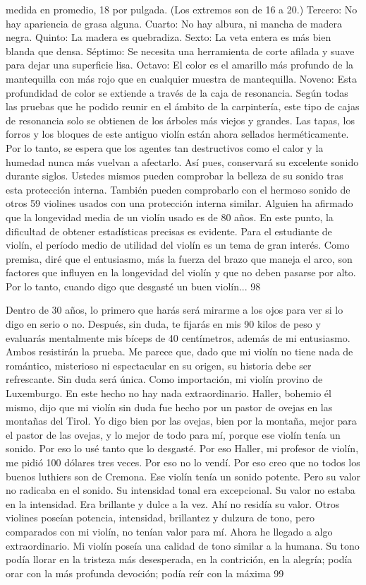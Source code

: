 medida en promedio, 18 por pulgada. (Los extremos son de 16 a 20.) Tercero: No hay apariencia de grasa alguna. Cuarto: No hay albura, ni mancha de madera negra. Quinto: La madera es quebradiza. Sexto: La veta entera es más bien blanda que densa. Séptimo: Se necesita una herramienta de corte afilada y suave para dejar una superficie lisa. Octavo: El color es el amarillo más profundo de la mantequilla con más rojo que en cualquier muestra de mantequilla. Noveno: Esta profundidad de color se extiende a través de la caja de resonancia.
Según todas las pruebas que he podido reunir en el ámbito de la carpintería, este tipo de cajas de resonancia solo se obtienen de los árboles más viejos y grandes.
Las tapas, los forros y los bloques de este antiguo violín están ahora sellados herméticamente. Por lo tanto, se espera que los agentes tan destructivos como el calor y la humedad nunca más vuelvan a afectarlo. Así pues, conservará su excelente sonido durante siglos. Ustedes mismos pueden comprobar la belleza de su sonido tras esta protección interna. También pueden comprobarlo con el hermoso sonido de otros 59 violines usados con una protección interna similar.
Alguien ha afirmado que la longevidad media de un violín usado es de 80 años. En este punto, la dificultad de obtener estadísticas precisas es evidente. Para el estudiante de violín, el período medio de utilidad del violín es un tema de gran interés. Como premisa, diré que el entusiasmo, más la fuerza del brazo que maneja el arco, son factores que influyen en la longevidad del violín y que no deben pasarse por alto. Por lo tanto, cuando digo que desgasté un buen violín...
98

Dentro de 30 años, lo primero que harás será mirarme a los ojos para ver si lo digo en serio o no. Después, sin duda, te fijarás en mis 90 kilos de peso y evaluarás mentalmente mis bíceps de 40 centímetros, además de mi entusiasmo. Ambos resistirán la prueba.
Me parece que, dado que mi violín no tiene nada de romántico, misterioso ni espectacular en su origen, su historia debe ser refrescante. Sin duda será única. Como importación, mi violín provino de Luxemburgo. En este hecho no hay nada extraordinario. Haller, bohemio él mismo, dijo que mi violín sin duda fue hecho por un pastor de ovejas en las montañas del Tirol. Yo digo bien por las ovejas, bien por la montaña, mejor para el pastor de las ovejas, y lo mejor de todo para mí, porque ese violín tenía un sonido. Por eso lo usé tanto que lo desgasté. Por eso Haller, mi profesor de violín, me pidió 100 dólares tres veces. Por eso no lo vendí. Por eso creo que no todos los buenos luthiers son de Cremona. Ese violín tenía un sonido potente. Pero su valor no radicaba en el sonido. Su intensidad tonal era excepcional. Su valor no estaba en la intensidad. Era brillante y dulce a la vez. Ahí no residía su valor. Otros violines poseían potencia, intensidad, brillantez y dulzura de tono, pero comparados con mi violín, no tenían valor para mí. Ahora he llegado a algo extraordinario. Mi violín poseía una calidad de tono similar a la humana. Su tono podía llorar en la tristeza más desesperada, en la contrición, en la alegría; podía orar con la más profunda devoción; podía reír con la máxima 99

